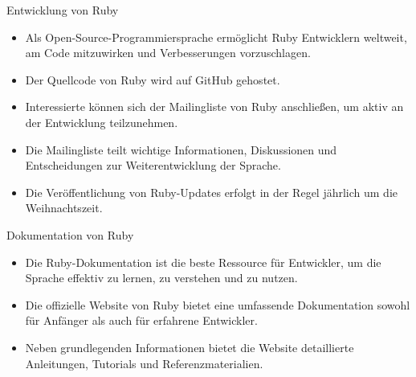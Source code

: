 \documentclass{beamer}
\begin{document}
\begin{frame}{Entwicklung von Ruby}
  \begin{itemize}
    \item Als Open-Source-Programmiersprache ermöglicht Ruby Entwicklern weltweit, am Code mitzuwirken und Verbesserungen vorzuschlagen.
    \item Der Quellcode von Ruby wird auf GitHub gehostet.
    \item Interessierte können sich der Mailingliste von Ruby anschließen, um aktiv an der Entwicklung teilzunehmen.
    \item Die Mailingliste teilt wichtige Informationen, Diskussionen und Entscheidungen zur Weiterentwicklung der Sprache.
    \item Die Veröffentlichung von Ruby-Updates erfolgt in der Regel jährlich um die Weihnachtszeit.
  \end{itemize}
\end{frame}
\begin{frame}{Dokumentation von Ruby}
  \begin{itemize}
    \item Die Ruby-Dokumentation ist die beste Ressource für Entwickler, um die Sprache effektiv zu lernen, zu verstehen und zu nutzen.
    \item Die offizielle Website von Ruby bietet eine umfassende Dokumentation sowohl für Anfänger als auch für erfahrene Entwickler.
    \item Neben grundlegenden Informationen bietet die Website detaillierte Anleitungen, Tutorials und Referenzmaterialien.
  \end{itemize}
\end{frame}
\end{document}
